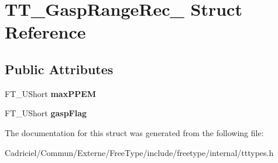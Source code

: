 \hypertarget{struct_t_t___gasp_range_rec__}{\section{T\-T\-\_\-\-Gasp\-Range\-Rec\-\_\- Struct Reference}
\label{struct_t_t___gasp_range_rec__}
}
\subsection*{Public Attributes}
\begin{DoxyCompactItemize}
\item 
\hypertarget{struct_t_t___gasp_range_rec___aa3fab31f6c0659b4deff402e210e15c9}{F\-T\-\_\-\-U\-Short {\bfseries max\-P\-P\-E\-M}}\label{struct_t_t___gasp_range_rec___aa3fab31f6c0659b4deff402e210e15c9}

\item 
\hypertarget{struct_t_t___gasp_range_rec___a9fc298dc0e46d31507728ae25585118d}{F\-T\-\_\-\-U\-Short {\bfseries gasp\-Flag}}\label{struct_t_t___gasp_range_rec___a9fc298dc0e46d31507728ae25585118d}

\end{DoxyCompactItemize}


The documentation for this struct was generated from the following file\-:\begin{DoxyCompactItemize}
\item 
Cadriciel/\-Commun/\-Externe/\-Free\-Type/include/freetype/internal/tttypes.\-h\end{DoxyCompactItemize}
